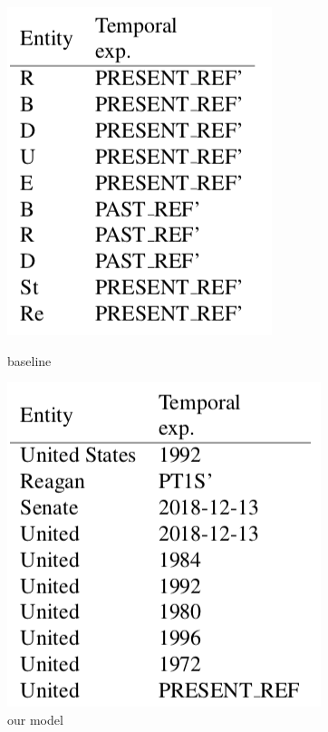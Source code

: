\documentclass[12pt,a4paper]{article}
\begin{document}
\begin{figure}[htbp]
\begin{minipage}[t]{0.43\linewidth}
    \includegraphics[width=\linewidth]{base_set2}
    \caption{baseline}
\end{minipage}%
    \hfill%
\begin{minipage}[t]{0.52\linewidth}
    \includegraphics[width=\linewidth]{new_set2}
    \caption{our model}
\end{minipage} 
\end{figure}
\end{document}
